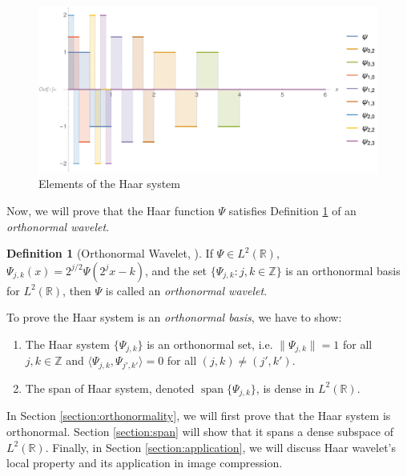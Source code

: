 \documentclass[11pt]{amsart}
\theoremstyle{theorem} %
\theoremstyle{definition}
\newtheorem{defn}[thm]{Definition}
\theoremstyle{example}
\theoremstyle{remark}
\numberwithin{equation}{section}
\newcommand{\R}{\mathbb{R}}
\newcommand{\Z}{\mathbb{Z}}
\DeclareMathOperator{\spn}{span}
\begin{document}
\begin{figure}[h]
	\centering
	\includegraphics[width=0.7\linewidth]{img/haar_system2}
	\caption[Elements of the Haar system]{Elements of the Haar system}
	\label{fig:haarsystem}
\end{figure}
	
Now, we will prove that the Haar function $ \varPsi $ satisfies Definition \ref{def:wavelet} of an \emph{orthonormal wavelet}.

\begin{defn}[Orthonormal Wavelet, {\cite[303]{pinsky}}] \label{def:wavelet}
	If $ \varPsi \in L^2(\R) $, $ \varPsi_{j,k}(x) = 2^{j/2} \varPsi (2^j x-k) $, and the set $ \{ \varPsi_{j,k}: j,k \in \Z \} $ is an orthonormal basis for $ L^2(\R) $, then $ \varPsi $ is called an \emph{orthonormal wavelet}.
\end{defn}

To prove the Haar system is an \textit{orthonormal basis}, we have to show:
	\begin{enumerate}
		\item The Haar system $ \{ \varPsi_{j,k} \} $ is an orthonormal set, i.e. $ \| \varPsi_{j,k} \| = 1 $ for all $ j,k \in \Z $ and $ \langle \varPsi_{j,k}, \varPsi_{j',k'} \rangle = 0 $ for all $ (j,k) \neq (j',k') $.
		
		\item The span of Haar system, denoted $ \spn\{\varPsi_{j,k}\} $, is dense in $ L^2(\R) $.
	\end{enumerate}

In Section \ref{section:orthonormality}, we will first prove that the Haar system is orthonormal. Section \ref{section:span} will show that it spans a dense subspace of  $ L^2(\R) $. Finally, in Section \ref{section:application}, we will discuss Haar wavelet's local property and its application in image compression.
\end{document}
